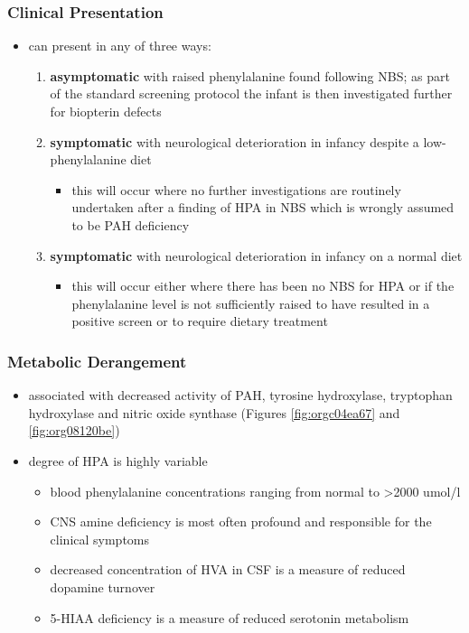 \documentclass[12pt]{scrartcl}
\begin{document}
\subsubsection{Clinical Presentation}
\label{sec:orgec2df17}
\begin{itemize}
\item can present in any of three ways:
\begin{enumerate}
\item \textbf{asymptomatic} with raised phenylalanine found following NBS; as part of
the standard screening protocol the infant is then investigated
further for biopterin defects
\item \textbf{symptomatic} with neurological deterioration in infancy despite a
low-phenylalanine diet
\begin{itemize}
\item this will occur where no further investigations are routinely
undertaken after a finding of HPA in NBS which is wrongly
assumed to be PAH deficiency
\end{itemize}
\item \textbf{symptomatic} with neurological deterioration in infancy on a
normal diet
\begin{itemize}
\item this will occur either where there has been no NBS for HPA or
if the phenylalanine level is not sufficiently raised to have
resulted in a positive screen or to require dietary treatment
\end{itemize}
\end{enumerate}
\end{itemize}
\subsubsection{Metabolic Derangement}
\label{sec:orgba66f27}
\begin{itemize}
\item associated with decreased activity of PAH, tyrosine hydroxylase,
tryptophan hydroxylase and nitric oxide synthase (Figures \ref{fig:orgc04ea67}
and \ref{fig:org08120be})
\item degree of HPA is highly variable
\begin{itemize}
\item blood phenylalanine concentrations ranging from normal to \textgreater{}2000
umol/l
\item CNS amine deficiency is most often profound and responsible for
the clinical symptoms
\item decreased concentration of HVA in CSF is a measure of reduced
dopamine turnover
\item 5-HIAA deficiency is a measure of reduced serotonin metabolism
\end{itemize}
\end{itemize}
\end{document}
